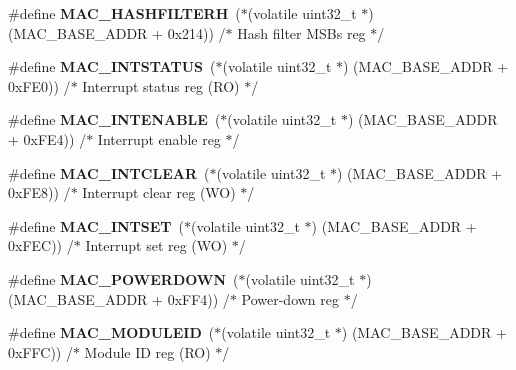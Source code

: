 \begin{DoxyCompactItemize}
\item 
\mbox{\label{group__lpc24xx__regs_ga66929f01392793f19cad01c2b82d6cef}} 
\#define {\bfseries M\+A\+C\+\_\+\+H\+A\+S\+H\+F\+I\+L\+T\+E\+RH}~($\ast$(volatile uint32\+\_\+t $\ast$) (M\+A\+C\+\_\+\+B\+A\+S\+E\+\_\+\+A\+D\+DR + 0x214)) /$\ast$ Hash filter M\+S\+Bs reg $\ast$/
\item 
\mbox{\label{group__lpc24xx__regs_ga60e6a02716dc33cef5e68895e6d7be15}} 
\#define {\bfseries M\+A\+C\+\_\+\+I\+N\+T\+S\+T\+A\+T\+US}~($\ast$(volatile uint32\+\_\+t $\ast$) (M\+A\+C\+\_\+\+B\+A\+S\+E\+\_\+\+A\+D\+DR + 0x\+F\+E0)) /$\ast$ Interrupt status reg (\+R\+O) $\ast$/
\item 
\mbox{\label{group__lpc24xx__regs_gaff03d247522a967fa8475953e0ffb337}} 
\#define {\bfseries M\+A\+C\+\_\+\+I\+N\+T\+E\+N\+A\+B\+LE}~($\ast$(volatile uint32\+\_\+t $\ast$) (M\+A\+C\+\_\+\+B\+A\+S\+E\+\_\+\+A\+D\+DR + 0x\+F\+E4)) /$\ast$ Interrupt enable reg  $\ast$/
\item 
\mbox{\label{group__lpc24xx__regs_ga6ebb89573a521a7ae45503fefc58d876}} 
\#define {\bfseries M\+A\+C\+\_\+\+I\+N\+T\+C\+L\+E\+AR}~($\ast$(volatile uint32\+\_\+t $\ast$) (M\+A\+C\+\_\+\+B\+A\+S\+E\+\_\+\+A\+D\+DR + 0x\+F\+E8)) /$\ast$ Interrupt clear reg (\+W\+O) $\ast$/
\item 
\mbox{\label{group__lpc24xx__regs_ga162f95c6e1fea9faee21d3a0c2b51519}} 
\#define {\bfseries M\+A\+C\+\_\+\+I\+N\+T\+S\+ET}~($\ast$(volatile uint32\+\_\+t $\ast$) (M\+A\+C\+\_\+\+B\+A\+S\+E\+\_\+\+A\+D\+DR + 0x\+F\+E\+C)) /$\ast$ Interrupt set reg (\+W\+O) $\ast$/
\item 
\mbox{\label{group__lpc24xx__regs_ga3a311b6eb0e16467ab95568cb4f7fc8a}} 
\#define {\bfseries M\+A\+C\+\_\+\+P\+O\+W\+E\+R\+D\+O\+WN}~($\ast$(volatile uint32\+\_\+t $\ast$) (M\+A\+C\+\_\+\+B\+A\+S\+E\+\_\+\+A\+D\+DR + 0x\+F\+F4)) /$\ast$ Power-\/down reg $\ast$/
\item 
\mbox{\label{group__lpc24xx__regs_ga6d67b520e160d20ea59bdba377ab4048}} 
\#define {\bfseries M\+A\+C\+\_\+\+M\+O\+D\+U\+L\+E\+ID}~($\ast$(volatile uint32\+\_\+t $\ast$) (M\+A\+C\+\_\+\+B\+A\+S\+E\+\_\+\+A\+D\+DR + 0x\+F\+F\+C)) /$\ast$ Module I\+D reg (\+R\+O) $\ast$/

\end{DoxyCompactItemize}
